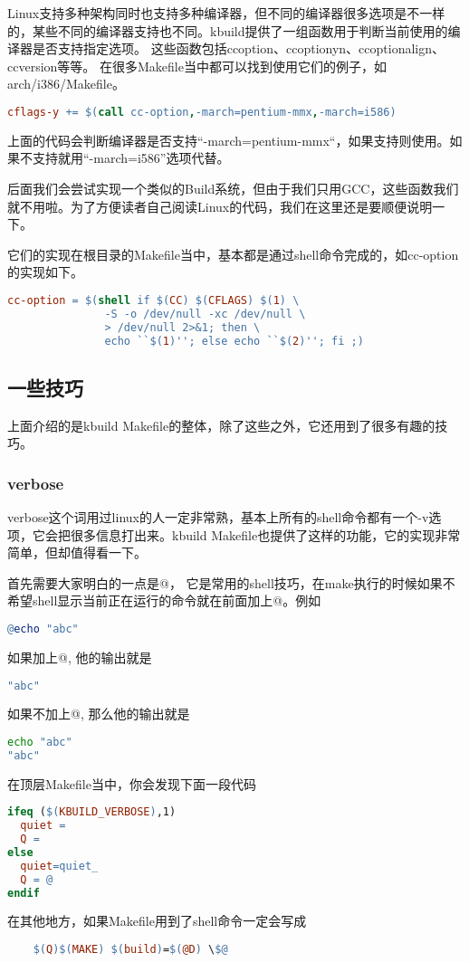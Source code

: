 Linux支持多种架构同时也支持多种编译器，但不同的编译器很多选项是不一样的，某些不同的编译器支持也不同。kbuild提供了一组函数用于判断当前使用的编译器是否支持指定选项。
这些函数包括cc\-option、cc\-option\-yn、cc\-option\-align、cc\-version等等。
在很多Makefile当中都可以找到使用它们的例子，如arch/i386/Makefile。
\begin{lstlisting}[language=make]
cflags-y += $(call cc-option,-march=pentium-mmx,-march=i586)
\end{lstlisting}
上面的代码会判断编译器是否支持“-march=pentium-mmx“，如果支持则使用。如果不支持就用“-march=i586”选项代替。

后面我们会尝试实现一个类似的Build系统，但由于我们只用GCC，这些函数我们就不用啦。为了方便读者自己阅读Linux的代码，我们在这里还是要顺便说明一下。


它们的实现在根目录的Makefile当中，基本都是通过shell命令完成的，如cc-option的实现如下。
\begin{lstlisting}[language=make]
cc-option = $(shell if $(CC) $(CFLAGS) $(1) \
               -S -o /dev/null -xc /dev/null \
               > /dev/null 2>&1; then \
               echo ``$(1)''; else echo ``$(2)''; fi ;)

\end{lstlisting}
\subsection{一些技巧}
上面介绍的是kbuild Makefile的整体，除了这些之外，它还用到了很多有趣的技巧。
\subsubsection{verbose}
verbose这个词用过linux的人一定非常熟，基本上所有的shell命令都有一个-v选项，它会把很多信息打出来。kbuild Makefile也提供了这样的功能，它的实现非常简单，但却值得看一下。

首先需要大家明白的一点是@， 它是常用的shell技巧，在make执行的时候如果不希望shell显示当前正在运行的命令就在前面加上@。例如
\begin{lstlisting}[language=make]
@echo "abc"
\end{lstlisting}
如果加上@, 他的输出就是
\begin{lstlisting}[language=bash]
"abc"
\end{lstlisting}
如果不加上@, 那么他的输出就是
\begin{lstlisting}[language=bash]
echo "abc"
"abc"
\end{lstlisting}

在顶层Makefile当中，你会发现下面一段代码
\begin{lstlisting}[language=make]
ifeq ($(KBUILD_VERBOSE),1)
  quiet =
  Q =
else
  quiet=quiet_
  Q = @
endif
\end{lstlisting}
在其他地方，如果Makefile用到了shell命令一定会写成

\begin{lstlisting}[language=make]
%.s: %.c scripts FORCE
    $(Q)$(MAKE) $(build)=$(@D) \$@
\end{lstlisting}

